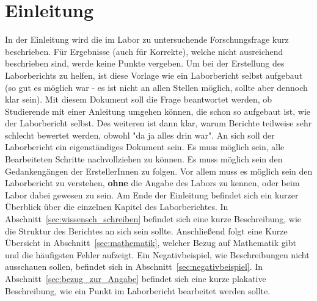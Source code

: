 \section*{Einleitung}
In der Einleitung wird die im Labor zu untersuchende Forschungsfrage kurz beschrieben. Für Ergebnisse (auch für Korrekte), welche nicht ausreichend beschrieben sind, werde keine Punkte vergeben. Um bei der Erstellung des Laborberichts zu helfen, ist diese Vorlage wie ein Laborbericht selbst aufgebaut (so gut es möglich war - es ist nicht an allen Stellen möglich, sollte aber dennoch klar sein). Mit diesem Dokument soll die Frage beantwortet werden, ob Studierende mit einer Anleitung umgehen können, die schon so aufgebaut ist, wie der Laborbericht selbst. Des weiteren ist dann klar, warum Berichte teilweise sehr schlecht bewertet werden, obwohl "da ja alles drin war". An sich soll der Laborbericht ein eigenständiges Dokument sein. Es muss möglich sein, alle Bearbeiteten Schritte nachvollziehen zu können. Es muss möglich sein den Gedankengängen der ErstellerInnen zu folgen. Vor allem muss es möglich sein den Laborbericht zu verstehen, \textbf{ohne} die Angabe des Labors zu kennen, oder beim Labor dabei gewesen zu sein. Am Ende der Einleitung befindet sich ein kurzer Überblick über die einzelnen Kapitel des Laborberichtes. In Abschnitt~\ref{sec:wissensch_schreiben} befindet sich eine kurze Beschreibung, wie die Struktur des Berichtes an sich sein sollte. Anschließend folgt eine Kurze Übersicht in Abschnitt~\ref{sec:mathematik}, welcher Bezug auf Mathematik gibt und die häufigsten Fehler aufzeigt. Ein Negativbeispiel, wie Beschreibungen nicht ausschauen sollen, befindet sich in Abschnitt~\ref{sec:negativbeispiel}. In Abschnitt~\ref{sec:bezug_zur_Angabe} befindet sich eine kurze plakative Beschreibung, wie ein Punkt im Laborbericht bearbeitet werden sollte.



